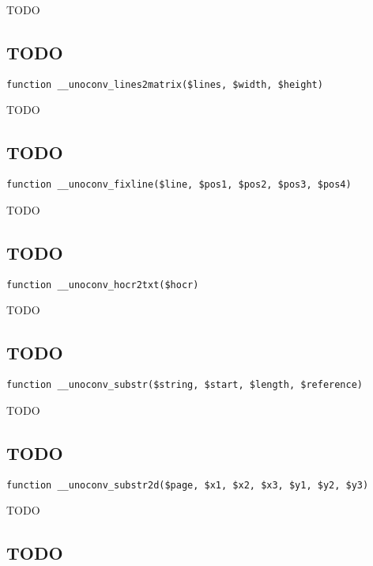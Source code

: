 \documentclass[a4paper]{book}
\begin{document}
TODO

\hypertarget{toc299}{}
\subsection{TODO}

\begin{lstlisting}
function __unoconv_lines2matrix($lines, $width, $height)
\end{lstlisting}

TODO

\hypertarget{toc300}{}
\subsection{TODO}

\begin{lstlisting}
function __unoconv_fixline($line, $pos1, $pos2, $pos3, $pos4)
\end{lstlisting}

TODO

\hypertarget{toc301}{}
\subsection{TODO}

\begin{lstlisting}
function __unoconv_hocr2txt($hocr)
\end{lstlisting}

TODO

\hypertarget{toc302}{}
\subsection{TODO}

\begin{lstlisting}
function __unoconv_substr($string, $start, $length, $reference)
\end{lstlisting}

TODO

\hypertarget{toc303}{}
\subsection{TODO}

\begin{lstlisting}
function __unoconv_substr2d($page, $x1, $x2, $x3, $y1, $y2, $y3)
\end{lstlisting}

TODO

\hypertarget{toc304}{}
\subsection{TODO}
\end{document}
